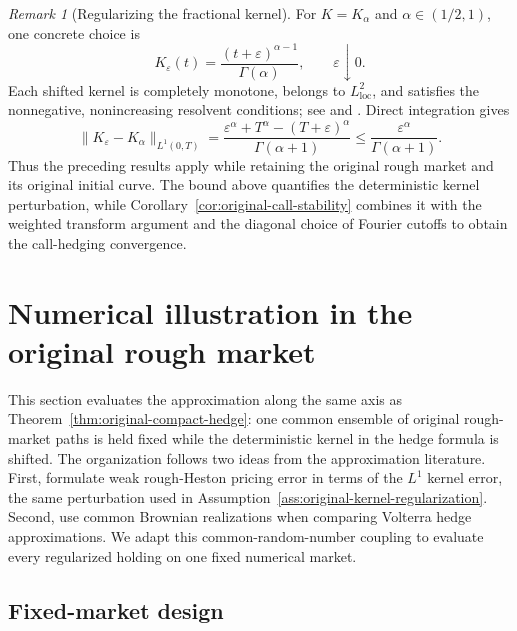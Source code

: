 \documentclass[11pt]{article}
\theoremstyle{definition}
\theoremstyle{remark}
\newtheorem{remark}[theorem]{Remark}
\newcommand{\1}{\mathbf{1}}
\begin{document}
\begin{remark}[Regularizing the fractional kernel]
\label{rem:original-shifted-kernel}
For $K=K_\alpha$ and $\alpha\in(1/2,1)$, one concrete choice is
\[
 K_\varepsilon(t)=\frac{(t+\varepsilon)^{\alpha-1}}{\Gamma(\alpha)},
 \qquad\varepsilon\downarrow0.
\]
Each shifted kernel is completely monotone, belongs to
$L^2_{\mathrm{loc}}$, and satisfies the nonnegative, nonincreasing
resolvent conditions; see \citet[Example~2.4]{abijaber2021weak} and
\citet{gripenberg1990}. Direct integration gives
\[
 \|K_\varepsilon-K_\alpha\|_{L^1(0,T)}
 =\frac{\varepsilon^\alpha+T^\alpha-(T+\varepsilon)^\alpha}
        {\Gamma(\alpha+1)}
 \leq\frac{\varepsilon^\alpha}{\Gamma(\alpha+1)}.
\]
Thus the preceding results apply while retaining the original rough
market and its original initial curve. The bound above quantifies the
deterministic kernel perturbation, while
Corollary~\ref{cor:original-call-stability} combines it with the weighted
transform argument and the diagonal choice of Fourier cutoffs to obtain the
call-hedging convergence.
\end{remark}

\section{Numerical illustration in the original rough market}
\label{sec:original-market-numerics}

This section evaluates the approximation along the same axis as
Theorem~\ref{thm:original-compact-hedge}: one common ensemble of original
rough-market paths is held fixed while the deterministic kernel in the hedge
formula is shifted.
The organization follows two ideas from the approximation literature. First,
\citet{bayerbreneis2023weak} formulate weak rough-Heston pricing error in
terms of the $L^1$ kernel error, the same perturbation used in
Assumption~\ref{ass:original-kernel-regularization}. Second,
\citet{dinunnoyurchenko2026} use common Brownian realizations when comparing
Volterra hedge approximations. We adapt this common-random-number coupling to
evaluate every regularized holding on one fixed numerical market.

\subsection{Fixed-market design}
\end{document}
